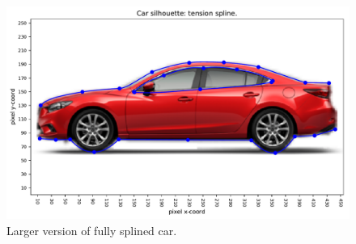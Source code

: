 \documentclass{article}
\begin{document}
\begin{figure}
  \centering
  \includegraphics[width=\columnwidth]{figs/p2-car-tension-splines-extra-large.pdf}
  \caption{Larger version of fully splined car.}
\end{figure}


%
\end{document}
